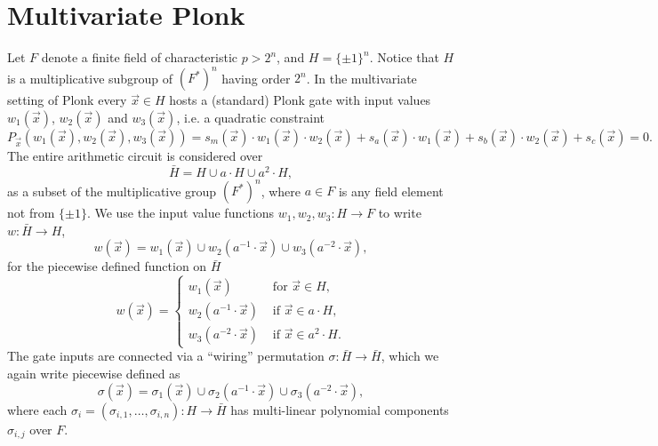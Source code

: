 \documentclass[11pt]{article}
\theoremstyle{definition}
\theoremstyle{remark}
\begin{document}
\section{Multivariate Plonk}

Let $F$ denote a finite field of characteristic $p > 2^n$, and $H= \{\pm 1\}^n$. 
Notice that $H$ is a multiplicative subgroup of $(F^*)^n$ having order $2^n$. 
%
In the multivariate setting of Plonk  every $\vec x \in H$ hosts a (standard) Plonk gate with input values $w_1(\vec x)$, $w_2(\vec x)$ and $w_3(\vec x)$, i.e. a quadratic constraint
\begin{equation}
\label{e:QuadraticConstraint}
P_{\vec x}(w_1(\vec x), w_2(\vec x), w_3(\vec x) ) = s_m(\vec x)\cdot w_1(\vec x) \cdot w_2(\vec x) + s_a(\vec x) \cdot w_1(\vec x) + s_b(\vec x)\cdot w_2(\vec x) + s_c(\vec x) = 0.
\end{equation}
The entire arithmetic circuit is considered over
\begin{equation}
\bar H = H\cup a\cdot H \cup a^2 \cdot H,
\end{equation}
as a subset of the multiplicative group $(F^*)^n$, where $a\in F$ is any field element not from $\{\pm 1\}$.
We use the input value functions $w_1, w_2, w_3: H\longrightarrow F$ to write $w: \bar H\longrightarrow H$,  
\begin{equation}
w(\vec x) = w_1(\vec x) \cup w_2( a^{-1}\cdot \vec x) \cup w_3(a^{-2}\cdot \vec x), 
\end{equation}
for the piecewise defined function on $\bar H$
\[
w(\vec x) = 
\begin{cases}
w_1(\vec x) & \text{ for }\vec x\in H,
\\
w_2(a^{-1}\cdot\vec x) & \text{ if } \vec x \in a\cdot H,
\\
w_3(a^{-2}\cdot\vec x) & \text{ if } \vec x \in a^2\cdot H.
\end{cases}
\]
The gate inputs are connected via a ``wiring'' permutation $\sigma: \bar H\rightarrow \bar H$, which we again write piecewise defined as 
\begin{equation}
\sigma(\vec x) = \sigma_1(\vec x) \cup \sigma_2(a^{-1}\cdot \vec x) \cup \sigma_3(a^{-2}\cdot \vec x),
\end{equation}
where each $\sigma_i = (\sigma_{i,1}, \ldots, \sigma_{i,n}): H \longrightarrow \bar H$ has multi-linear polynomial components $\sigma_{i,j}$ over $F$.
\end{document}
